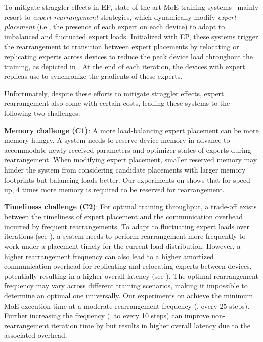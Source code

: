 To mitigate straggler effects in EP, state-of-the-art MoE training systems~\cite{nie2023flexmoe,zhai2023smartmoe,he2022fastermoe} mainly resort to \textit{expert rearrangement} strategies, which dynamically modify \textit{expert placement} (i.e., the presence of each expert on each device) to adapt to imbalanced and fluctuated expert loads. 
Initialized with EP, these systems trigger the rearrangement to transition between expert placements by relocating or replicating experts across devices to reduce the peak device load throughout the training, as depicted in .
At the end of
each iteration, the devices with expert replicas use \collar to synchronize the gradients of these experts.%

Unfortunately, despite these efforts to mitigate straggler effects, expert rearrangement also come with certain costs, leading these systems to the following two challenges:

\textbf{Memory challenge (C1)}: A more load-balancing expert placement can be more memory-hungry. A system needs to reserve device memory in advance to accommodate newly received parameters and optimizer states of experts during rearrangement. When modifying expert placement, smaller reserved memory may hinder the system from considering candidate placements with larger memory footprints but balancing loads better.
Our experiments on \cite{nie2023flexmoe} shows that for \memorySpeedup speed up, 4 times more memory is required to be reserved for rearrangement. %

\textbf{Timeliness challenge (C2)}: For optimal training throughput, a trade-off exists between the timeliness of expert placement and the communication overhead incurred by frequent rearrangements.
To adapt to fluctuating expert loads over iterations (see ), a system needs to perform rearrangement more frequently to work under a placement timely for the current load distribution.
However, a higher rearrangement frequency can also lead to a higher amortized communication overhead for replicating and relocating experts between devices, potentially resulting in a higher overall latency (see ). The optimal rearrangement frequency may vary across different training scenarios, making it impossible to determine an optimal one universally.
Our experiments on \cite{zhai2023smartmoe} achieve the minimum MoE execution time at a moderate rearrangement frequency (\eg, every 25 steps). Further increasing the frequency (\eg, to every 10 steps) can improve non-rearrangement iteration time by \timelinessSpeedup but results in \timelinessSlowdown higher overall latency due to the associated overhead. %














